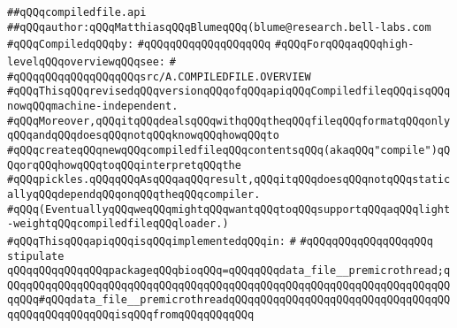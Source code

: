 \label{src/lib/compiler/execution/compiledfile/compiledfile.api}
\verb|##qQQqcompiledfile.api|\newline
\verb|##qQQqauthor:qQQqMatthiasqQQqBlumeqQQq(blume@research.bell-labs.com|\newline
\newline
\verb|#qQQqCompiledqQQqby:|\newline
\verb|#qQQqqQQqqQQqqQQqqQQq|\newline
\newline
\newline
\verb|#qQQqForqQQqaqQQqhigh-levelqQQqoverviewqQQqsee:|\newline
\verb|#|\newline
\verb|#qQQqqQQqqQQqqQQqqQQqsrc/A.COMPILEDFILE.OVERVIEW|\newline
\newline
\newline
\verb|#qQQqThisqQQqrevisedqQQqversionqQQqofqQQqapiqQQqCompiledfileqQQqisqQQqnowqQQqmachine-independent.|\newline
\verb|#qQQqMoreover,qQQqitqQQqdealsqQQqwithqQQqtheqQQqfileqQQqformatqQQqonlyqQQqandqQQqdoesqQQqnotqQQqknowqQQqhowqQQqto|\newline
\verb|#qQQqcreateqQQqnewqQQqcompiledfileqQQqcontentsqQQq(akaqQQq"compile")qQQqorqQQqhowqQQqtoqQQqinterpretqQQqthe|\newline
\verb|#qQQqpickles.qQQqqQQqAsqQQqaqQQqresult,qQQqitqQQqdoesqQQqnotqQQqstaticallyqQQqdependqQQqonqQQqtheqQQqcompiler.|\newline
\verb|#qQQq(EventuallyqQQqweqQQqmightqQQqwantqQQqtoqQQqsupportqQQqaqQQqlight-weightqQQqcompiledfileqQQqloader.)|\newline
\newline
\verb|#qQQqThisqQQqapiqQQqisqQQqimplementedqQQqin:|\newline
\verb|#|\newline
\verb|#qQQqqQQqqQQqqQQqqQQq|\newline
\newline
\verb|stipulate|\newline
\verb|qQQqqQQqqQQqqQQqpackageqQQqbioqQQq=qQQqqQQqdata_file__premicrothread;qQQqqQQqqQQqqQQqqQQqqQQqqQQqqQQqqQQqqQQqqQQqqQQqqQQqqQQqqQQqqQQqqQQqqQQqqQQq#qQQqdata_file__premicrothreadqQQqqQQqqQQqqQQqqQQqqQQqqQQqqQQqqQQqqQQqqQQqqQQqqQQqisqQQqfromqQQqqQQqqQQq|\newline
